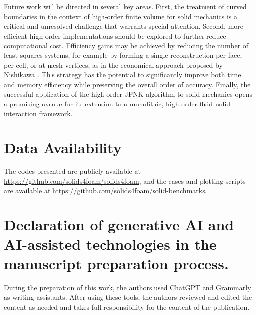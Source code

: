 \documentclass[review,3p]{elsarticle}
\begin{document}
Future work will be directed in several key areas. First, the treatment of curved boundaries in the context of high-order finite volume for solid mechanics is a critical and unresolved challenge that warrants special attention. 
Second, more efficient high-order implementations should be explored to further reduce computational cost. Efficiency gains may be achieved by reducing the number of least-squares systems, for example by forming a single reconstruction per face, per cell, or at mesh vertices, as in the economical approach proposed by Nishikawa \cite{Nishikawa2025}. This strategy has the potential to significantly improve both time and memory efficiency while preserving the overall order of accuracy.
Finally, the successful application of the high-order JFNK algorithm to solid mechanics opens a promising avenue for its extension to a monolithic, high-order fluid–solid interaction framework.
%
%
%
%
\section*{Data Availability}
%
The codes presented are publicly available at \url{https://github.com/solids4foam/solids4foam}, and the cases and plotting scripts are available at \url{https://github.com/solids4foam/solid-benchmarks}.
%
\section*{Declaration of generative AI and AI-assisted technologies in the manuscript preparation process.}
%
During the preparation of this work, the authors used ChatGPT and Grammarly as writing assistants.
After using these tools, the authors reviewed and edited the content as needed and takes full responsibility for the content of the publication.
%
\end{document}
